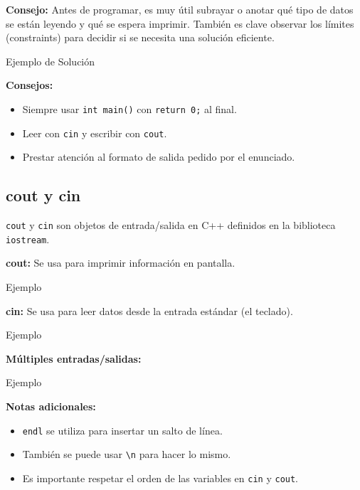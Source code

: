 \documentclass{article}
\newcommand{\cppfile}[2][]{
    \begin{container}{\faCode \space \space  #1}
        
    \end{container}
}
\begin{document}
\vspace{0.5cm}

\textbf{Consejo:} Antes de programar, es muy útil subrayar o anotar qué tipo de datos se están leyendo y qué se espera imprimir. También es clave observar los límites (constraints) para decidir si se necesita una solución eficiente.


\cppfile[Ejemplo de Solución]{codes/ejemplosuma.cpp}

\vspace{0.5cm}


\textbf{Consejos:}
\begin{itemize}
    \item Siempre usar \texttt{int main()} con \texttt{return 0;} al final.
    \item Leer con \texttt{cin} y escribir con \texttt{cout}.
    \item Prestar atención al formato de salida pedido por el enunciado.
\end{itemize}

\subsection{cout y cin}

\texttt{cout} y \texttt{cin} son objetos de entrada/salida en C++ definidos en la biblioteca \texttt{iostream}.

\vspace{1.5cm}


\textbf{cout:} Se usa para imprimir información en pantalla.



\cppfile[Ejemplo]{codes/cout.cpp}

\textbf{cin:} Se usa para leer datos desde la entrada estándar (el teclado).

\cppfile[Ejemplo]{codes/cinex.cpp}

\textbf{Múltiples entradas/salidas:}

\cppfile[Ejemplo]{codes/meys.cpp}

\textbf{Notas adicionales:}
\begin{itemize}
    \item \texttt{endl} se utiliza para insertar un salto de línea.
    \item También se puede usar \texttt{\textbackslash n} para hacer lo mismo.
    \item Es importante respetar el orden de las variables en \texttt{cin} y \texttt{cout}.
\end{itemize}
\end{document}
